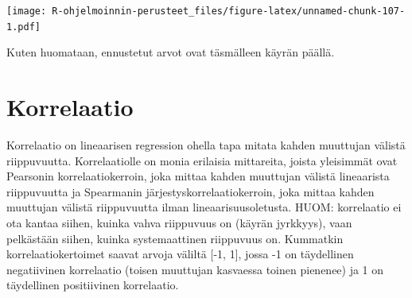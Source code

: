 \documentclass[
]{book}
\newenvironment{Shaded}{\begin{snugshade}}{\end{snugshade}}
\newcommand{\AttributeTok}[1]{\textcolor[rgb]{0.77,0.63,0.00}{#1}}
\newcommand{\CommentTok}[1]{\textcolor[rgb]{0.56,0.35,0.01}{\textit{#1}}}
\newcommand{\DecValTok}[1]{\textcolor[rgb]{0.00,0.00,0.81}{#1}}
\newcommand{\FunctionTok}[1]{\textcolor[rgb]{0.00,0.00,0.00}{#1}}
\newcommand{\NormalTok}[1]{#1}
\newcommand{\OtherTok}[1]{\textcolor[rgb]{0.56,0.35,0.01}{#1}}
\newcommand{\SpecialCharTok}[1]{\textcolor[rgb]{0.00,0.00,0.00}{#1}}
\newcommand{\StringTok}[1]{\textcolor[rgb]{0.31,0.60,0.02}{#1}}
\begin{document}
\begin{Shaded}
\end{Shaded}

\texttt{[image: R-ohjelmoinnin-perusteet\_files/figure-latex/unnamed-chunk-107-1.pdf]}

Kuten huomataan, ennustetut arvot ovat täsmälleen käyrän päällä.

\hypertarget{korrelaatio}{%
\section{Korrelaatio}\label{korrelaatio}}

Korrelaatio on lineaarisen regression ohella tapa mitata kahden muuttujan välistä riippuvuutta. Korrelaatiolle on monia erilaisia mittareita, joista yleisimmät ovat Pearsonin korrelaatiokerroin, joka mittaa kahden muuttujan välistä lineaarista riippuvuutta ja Spearmanin järjestyskorrelaatiokerroin, joka mittaa kahden muuttujan välistä riippuvuutta ilman lineaarisuusoletusta. HUOM: korrelaatio ei ota kantaa siihen, kuinka vahva riippuvuus on (käyrän jyrkkyys), vaan pelkästään siihen, kuinka systemaattinen riippuvuus on. Kummatkin korrelaatiokertoimet saavat arvoja väliltä {[}-1, 1{]}, jossa -1 on täydellinen negatiivinen korrelaatio (toisen muuttujan kasvaessa toinen pienenee) ja 1 on täydellinen positiivinen korrelaatio.
\end{document}
